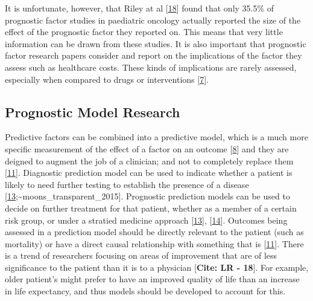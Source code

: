 \documentclass[12pt,PhD,twoside,openright]{muthesis}
\begin{document}
It is unfortunate, however, that Riley at al {[}\protect\hyperlink{ref-riley_systematic_2003-1}{18}{]} found that only 35.5\% of prognostic factor studies in paediatric oncology actually reported the size of the effect of the prognostic factor they reported on. This means that very little information can be drawn from these studies. It is also important that prognostic factor research papers consider and report on the implications of the factor they assess such as healthcare costs. These kinds of implications are rarely assessed, especially when compared to drugs or interventions {[}\protect\hyperlink{ref-riley_prognosis_2013}{7}{]}.

\hypertarget{prognostic-model-research}{%
\subsection{Prognostic Model Research}\label{prognostic-model-research}}

Predictive factors can be combined into a predictive model, which is a much more specific measurement of the effect of a factor on an outcome {[}\protect\hyperlink{ref-steyerberg_prognosis_2013}{8}{]} and they are deigned to augment the job of a clinician; and not to completely replace them {[}\protect\hyperlink{ref-moons_prognosis_2009}{11}{]}. Diagnostic prediction model can be used to indicate whether a patient is likely to need further testing to establish the presence of a disease {[}\protect\hyperlink{ref-collins_transparent_2015}{13};\textasciitilde moons\_transparent\_2015{]}. Prognostic prediction models can be used to decide on further treatment for that patient, whether as a member of a certain risk group, or under a stratied medicine approach {[}\protect\hyperlink{ref-collins_transparent_2015}{13}{]}, {[}\protect\hyperlink{ref-moons_transparent_2015}{14}{]}. Outcomes being assessed in a prediction model should be directly relevant to the patient (such as mortality) or have a direct causal relationship with something that is {[}\protect\hyperlink{ref-moons_prognosis_2009}{11}{]}. There is a trend of researchers focusing on areas of improvement that are of less significance to the patient than it is to a physician {[}\textbf{Cite: LR - 18}{]}. For example, older patient's might prefer to have an improved quality of life than an increase in life expectancy, and thus models should be developed to account for this.
\end{document}
